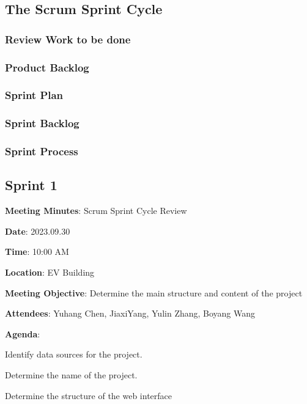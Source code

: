 \documentclass[conference]{IEEEtran}
\begin{document}
\subsection{\textbf{The Scrum Sprint Cycle}}

\subsubsection{\textbf{Review Work to be done}}


\subsubsection{\textbf{Product Backlog}}

\subsubsection{\textbf{Sprint Plan}}



\subsubsection{\textbf{Sprint Backlog}}

\subsubsection{\textbf{Sprint Process}}

\textbf{}

\subsection*{Sprint 1}

\textbf{Meeting Minutes}: Scrum Sprint Cycle Review

\textbf{Date}: 2023.09.30

\textbf{Time}: 10:00 AM

\textbf{Location}: EV Building

\textbf{Meeting Objective}: Determine the main structure and content of the project

\textbf{Attendees}:
Yuhang Chen, JiaxiYang, Yulin Zhang, Boyang Wang

\textbf{Agenda}:

Identify data sources for the project.

Determine the name of the project.

Determine the structure of the web interface
\end{document}

